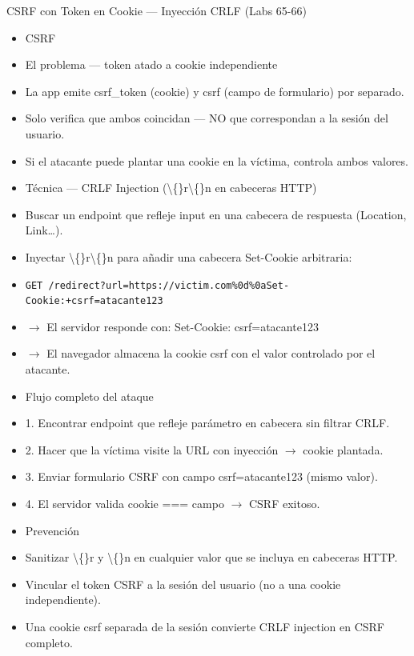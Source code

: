 \documentclass[aspectratio=169,10pt]{beamer}
\newcommand{\cmd}[1]{\texttt{\color{uznavy}#1}}
\begin{document}
\begin{frame}[allowframebreaks]{CSRF con Token en Cookie --- Inyección CRLF (Labs 65-66)}
\small
  \begin{itemize}
  \item CSRF
  \item El problema --- token atado a cookie independiente
  \item La app emite csrf\_token (cookie) y csrf (campo de formulario) por separado.
  \item Solo verifica que ambos coincidan --- NO que correspondan a la sesión del usuario.
  \item Si el atacante puede plantar una cookie en la víctima, controla ambos valores.
  \item Técnica --- CRLF Injection (\textbackslash\{\}r\textbackslash\{\}n en cabeceras HTTP)
  \item Buscar un endpoint que refleje input en una cabecera de respuesta (Location, Link\dots{}).
  \item Inyectar \textbackslash\{\}r\textbackslash\{\}n para añadir una cabecera Set-Cookie arbitraria:
  \item \cmd{GET /redirect?url=https://victim.com\%0d\%0aSet-Cookie:+csrf=atacante123}
  \item $\rightarrow$ El servidor responde con: Set-Cookie: csrf=atacante123
  \item $\rightarrow$ El navegador almacena la cookie csrf con el valor controlado por el atacante.
  \item Flujo completo del ataque
  \item 1. Encontrar endpoint que refleje parámetro en cabecera sin filtrar CRLF.
  \item 2. Hacer que la víctima visite la URL con inyección $\rightarrow$ cookie plantada.
  \item 3. Enviar formulario CSRF con campo csrf=atacante123 (mismo valor).
  \item 4. El servidor valida cookie === campo $\rightarrow$ CSRF exitoso.
  \item Prevención
  \item Sanitizar \textbackslash\{\}r y \textbackslash\{\}n en cualquier valor que se incluya en cabeceras HTTP.
  \item Vincular el token CSRF a la sesión del usuario (no a una cookie independiente).
  \item Una cookie csrf separada de la sesión convierte CRLF injection en CSRF completo.
  \end{itemize}
\end{frame}
\end{document}
